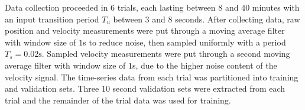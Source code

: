 
Data collection proceeded in 6 trials, each lasting between 8 and 40 minutes with an input transition period $T_u$ between 3 and 8 seconds. 
After collecting data, raw position and velocity measurements were put through a moving average filter with window size of $1$s to reduce noise, then sampled uniformly with a period $T_s = 0.02 \text{s}$.
Sampled velocity measurements were put through a second moving average filter with window size of $1$s, due to the higher noise content of the velocity signal.
The time-series data from each trial was partitioned into training and validation sets. 
Three 10 second validation sets were extracted from each trial and the remainder of the trial data was used for training.

